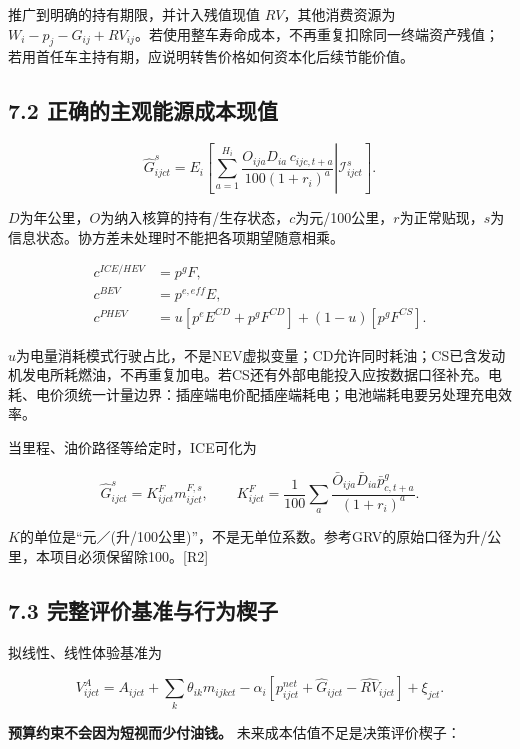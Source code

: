 \documentclass[
  11pt,
]{article}
\begin{document}
推广到明确的持有期限，并计入残值现值 \(RV\)，其他消费资源为
\(W_i-p_j-G_{ij}+RV_{ij}\)。若使用整车寿命成本，不再重复扣除同一终端资产残值；若用首任车主持有期，应说明转售价格如何资本化后续节能价值。

\subsection{7.2
正确的主观能源成本现值}\label{ux6b63ux786eux7684ux4e3bux89c2ux80fdux6e90ux6210ux672cux73b0ux503c}

\[
\widehat G_{ijct}^{s}
=E_i\left[
\left.\sum_{a=1}^{H_i}
\frac{O_{ija}D_{ia}\,c_{ijc,t+a}}{100(1+r_i)^a}
\right|\mathcal I_{ijct}^{s}
\right]. \tag{19}
\]

\(D\)为年公里，\(O\)为纳入核算的持有/生存状态，\(c\)为元/100公里，\(r\)为正常贴现，\(s\)为信息状态。协方差未处理时不能把各项期望随意相乘。

\[
\begin{aligned}
c^{ICE/HEV}&=p^gF,\\
c^{BEV}&=p^{e,eff}E,\\
c^{PHEV}&=u[p^eE^{CD}+p^gF^{CD}]+(1-u)[p^gF^{CS}].
\end{aligned} \tag{20}
\]

\(u\)为电量消耗模式行驶占比，不是NEV虚拟变量；CD允许同时耗油；CS已含发动机发电所耗燃油，不再重复加电。若CS还有外部电能投入应按数据口径补充。电耗、电价须统一计量边界：插座端电价配插座端耗电；电池端耗电要另处理充电效率。

当里程、油价路径等给定时，ICE可化为

\[
\widehat G_{ijct}^{s}=K_{ijct}^{F}m_{ijct}^{F,s},\qquad
K_{ijct}^{F}=\frac1{100}\sum_a
\frac{\bar O_{ija}\bar D_{ia}\bar p_{c,t+a}^{g}}{(1+r_i)^a}. \tag{21}
\]

\(K\)的单位是``元／(升/100公里)''，不是无单位系数。参考GRV的原始口径为升/公里，本项目必须保留除100。{[}R2{]}

\subsection{7.3
完整评价基准与行为楔子}\label{ux5b8cux6574ux8bc4ux4ef7ux57faux51c6ux4e0eux884cux4e3aux6954ux5b50}

拟线性、线性体验基准为

\[
V_{ijct}^{A}=A_{ijct}+\sum_k\theta_{ik}m_{ijkct}
-\alpha_i[p_{ijct}^{net}+\widehat G_{ijct}-\widehat{RV}_{ijct}]+\xi_{jct}. \tag{22}
\]

\textbf{预算约束不会因为短视而少付油钱。}
未来成本估值不足是决策评价楔子：
\end{document}
